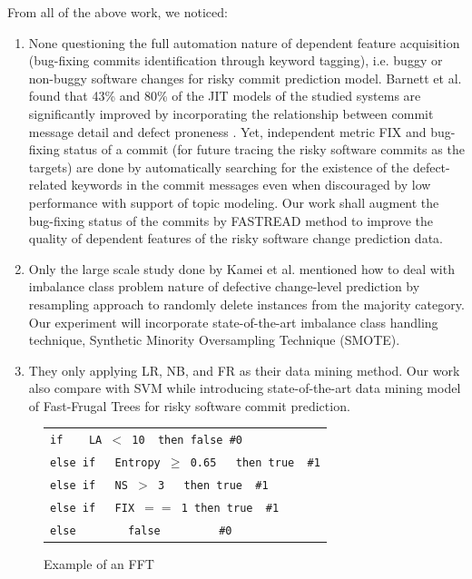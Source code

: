 \documentclass[sigconf,review, anonymous]{acmart}
\begin{document}
From all of the above work, we noticed: 
\begin{enumerate}
    \item None questioning the full automation nature of dependent feature acquisition (bug-fixing commits identification through keyword tagging), i.e. buggy or non-buggy software changes for risky commit prediction model. Barnett et al. found that 43\% and 80\% of the JIT models of the studied systems are significantly improved by incorporating the relationship between commit message detail and defect proneness \cite{barnett13_mcontent}. Yet, independent metric FIX and bug-fixing status of a commit (for future tracing the risky software commits as the targets) are done by automatically searching for the existence of the defect-related keywords in the commit messages even when discouraged by low performance with support of topic modeling. Our work shall augment the bug-fixing status of the commits by FASTREAD method to improve the quality of dependent features of the risky software change prediction data. 
    \item Only the large scale study done by Kamei et al. \cite{kamei12_jit} mentioned how to deal with imbalance class problem nature of defective change-level prediction by resampling approach to randomly delete instances from the majority category. Our experiment will incorporate state-of-the-art imbalance class handling technique, Synthetic Minority Oversampling Technique (SMOTE). 
    \item They only applying LR, NB, and FR as their data mining method. Our work also compare with SVM while introducing state-of-the-art data mining model of Fast-Frugal Trees for risky software commit prediction.    
\end{enumerate}

\begin{figure}[!b]

 {\normalsize
\begin{minipage}{\linewidth}
\vspace{-5mm}
\begin{tabular}{p{\linewidth}}
  \texttt{\qquad  if  \qquad \ \ \ LA $<$  10   \qquad \qquad  \ then false \qquad \#0} \\
  \texttt{\qquad  else if \ \ Entropy $\geq$  0.65    \ \      then true \qquad \  \#1} \\
   \texttt{\qquad else if \ \ NS $>$  3   \qquad \qquad \ \   then true \qquad \  \#1} \\
   \texttt{\qquad else if \ \ FIX $==$ 1    \qquad \qquad  then true \qquad \  \#1} \\
   \texttt{\qquad else \qquad \qquad \qquad \qquad \ \ \ \ \ \ \ false \ \  \ \ \ \ \ \  \#0} 
\end{tabular}
\end{minipage}
}
\vspace{-5mm}
\caption{Example of an FFT}
\label{fig:fft1}
\end{figure}
\end{document}
